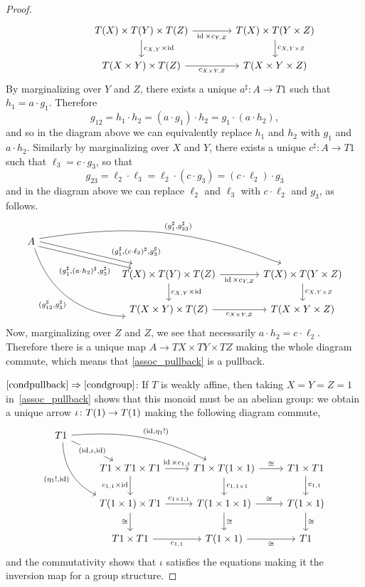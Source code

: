 \documentclass[a4paper,UKenglish,numberwithinsect,cleveref, autoref, thm-restate]{lipics-v2021}
\theoremstyle{plain} %
\theoremstyle{definition} %
\begin{document}
\begin{proof}
\[\begin{tikzcd}[column sep=3.3pc]
   & T(X) \times T(Y) \times T(Z) \ar{r}[swap]{\id \times c_{Y,Z}} \ar{d}{c_{X,Y} \times \id}	& T(X) \times T(Y \times Z) \ar{d}{c_{X,Y \times Z}}	\\
   & T(X \times Y) \times T(Z) \ar{r}[swap]{c_{X\times Y,Z}}						& T(X \times Y \times Z)
  \end{tikzcd}
 \]
 By marginalizing over $Y$ and $Z$, there exists a unique $a^\sharp:A\to T1$ such that $h_1 = a\cdot g_1$. 
 Therefore
 \[
  g_{12} = h_1\cdot h_2 = (a\cdot g_1) \cdot h_2 = g_1\cdot (a\cdot h_2) ,
 \]
 and so in the diagram above we can equivalently replace $h_1$ and $h_2$ with $g_1$ and $a\cdot h_2$.
 Similarly by marginalizing over $X$ and $Y$, there exists a unique $c^\sharp:A\to T1$ such that $\ell_3=c\cdot g_3$, so that
 \[
  g_{23}= \ell_2\cdot\ell_3 = \ell_2\cdot (c\cdot g_3) = (c\cdot \ell_2) \cdot g_3
 \]
 and in the diagram above we can replace $\ell_2$ and $\ell_3$ with $c\cdot \ell_2$ and $g_3$, as follows.
 \[
  \begin{tikzcd}[column sep=3.3pc]
   A \ar[bend left=15, shift left]{drrr}{(g_1^\sharp,g_{23}^\sharp)} \ar[bend right=35]{ddrr}[swap]{(g_{12}^\sharp,g_3^\sharp)} 
    \ar[shift left]{drr}[near end]{(g_1^\sharp,(c\cdot\ell_2)^\sharp,g_3^\sharp)} \ar[shift right]{drr}[swap, pos=0.8]{(g_1^\sharp,(a\cdot h_2)^\sharp, g_3^\sharp)} \\
   && T(X) \times T(Y) \times T(Z) \ar{r}[swap]{\id \times c_{Y,Z}} \ar{d}{c_{X,Y} \times \id}	& T(X) \times T(Y \times Z) \ar{d}{c_{X,Y \times Z}}	\\
   && T(X \times Y) \times T(Z) \ar{r}[swap]{c_{X\times Y,Z}}						& T(X \times Y \times Z)
  \end{tikzcd}
 \]
 Now, marginalizing over $Z$ and $Z$, we see that necessarily $a\cdot h_2=c\cdot \ell_2$. 
 Therefore there is a unique map $A\to TX\times TY\times TZ$ making the whole diagram commute, which means that \eqref{assoc_pullback} is a pullback.
 
 $\ref{condpullback}\Rightarrow\ref{condgroup}$:
 If $T$ is weakly affine, then taking $X = Y = Z = 1$ in~\eqref{assoc_pullback} shows that this monoid must be an abelian group: we obtain a unique arrow $\iota \colon T(1) \to T(1)$ making the following diagram commute,
	\[
		\begin{tikzcd}
			T1 \ar{dr}[description]{(\id,\iota,\id)} \ar[bend left=15]{drr}{(\id,\eta_1 !)} \ar[bend right,swap]{ddr}{(\eta_1 !,\id)} \\
			&	T1 \times T1 \times T1 \ar{r}{\id \times c_{1,1}} \ar[swap]{d}{c_{1,1} \times \id}	& T1 \times T(1\times 1) \ar{d}{c_{1,1\times 1}} \ar{r}{\cong} & T1\times T1 \ar{d}{c_{1,1}}	\\
			&	T(1\times 1) \times T1 \ar{r}{c_{1\times 1,1}} \ar{d}[swap]{\cong}	& T(1\times 1\times 1) \ar{d}{\cong} \ar{r}{\cong} & T(1\times 1) \ar{d}{\cong} \\
			& T1\times T1 \ar{r}[swap]{c_{1,1}} & T(1\times 1) \ar{r}[swap]{\cong} & T1
		\end{tikzcd}
	\]
	and the commutativity shows that $\iota$ satisfies the equations making it the inversion map for a group structure.
\end{proof}
\end{document}
